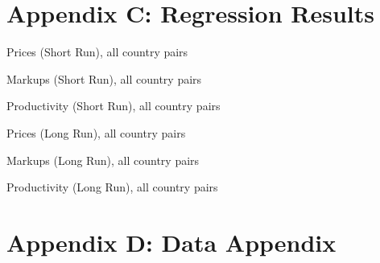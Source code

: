 \section{Appendix C: Regression Results}

\begin{table}
\tiny
\begin{center}\caption{Prices (Short Run), all country pairs\label{tb:prices_sr}}

\end{center}
\end{table}

\begin{table}
\tiny
\begin{center}\caption{Markups (Short Run), all country pairs\label{tb:markup_sr}}

\end{center}
\end{table}

\begin{table}
\tiny
\begin{center} \caption{Productivity (Short Run), all country pairs\label{tb:productivity_sr}}

\end{center}
\end{table}

\begin{table}
\tiny
\begin{center}\caption{Prices (Long Run), all country pairs\label{tb:prices_lr}}

\end{center}
\end{table}


\begin{table}
\tiny
\begin{center}\caption{Markups (Long Run), all country pairs\label{tb:markup_lr}}

\end{center}
\end{table}

\begin{table}
\tiny
\begin{center}\caption{Productivity (Long Run), all country pairs\label{tb:productivity_lr}}

\end{center}
\end{table}

\section{Appendix D: Data Appendix}
